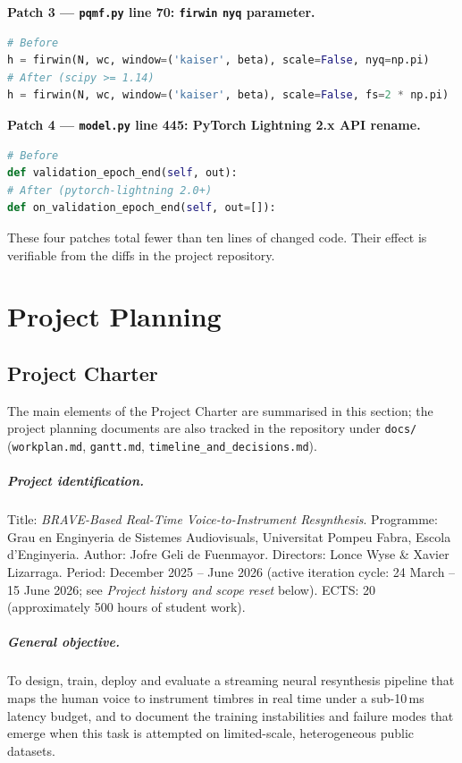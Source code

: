 \documentclass[a4paper,11pt,oneside,openany]{book}
\newcommand{\thesisAuthor}{Jofre Geli de Fuenmayor}
\newcommand{\thesisAdvisor}{Lonce Wyse \& Xavier Lizarraga}
\newcommand{\thesisInstitution}{Universitat Pompeu Fabra}
\newcommand{\thesisFaculty}{Escola d'Enginyeria}
\newcommand{\thesisDegree}{Grau en Enginyeria de Sistemes Audiovisuals}
\begin{document}
\begin{appendices}
\medskip\noindent\textbf{Patch 3 --- \texttt{pqmf.py} line 70: \texttt{firwin} \texttt{nyq} parameter.}\par\nobreak
\begin{lstlisting}[language=Python]
# Before
h = firwin(N, wc, window=('kaiser', beta), scale=False, nyq=np.pi)
# After (scipy >= 1.14)
h = firwin(N, wc, window=('kaiser', beta), scale=False, fs=2 * np.pi)
\end{lstlisting}

\medskip\noindent\textbf{Patch 4 --- \texttt{model.py} line 445: PyTorch Lightning 2.x API rename.}\par\nobreak
\begin{lstlisting}[language=Python]
# Before
def validation_epoch_end(self, out):
# After (pytorch-lightning 2.0+)
def on_validation_epoch_end(self, out=[]):
\end{lstlisting}

These four patches total fewer than ten lines of changed code. Their effect is verifiable from the diffs in the project repository.

\chapter{Project Planning}\label{app:planning}

\section{Project Charter}

The main elements of the Project Charter are summarised in this section; the project planning documents are also tracked in the repository under \texttt{docs/} (\texttt{workplan.md}, \texttt{gantt.md}, \texttt{timeline\_and\_decisions.md}).

\paragraph{Project identification.} Title: \emph{BRAVE-Based Real-Time Voice-to-Instrument Resynthesis}. Programme: \thesisDegree, \thesisInstitution, \thesisFaculty. Author: \thesisAuthor. Directors: \thesisAdvisor. Period: December 2025 -- June 2026 (active iteration cycle: 24 March -- 15 June 2026; see \emph{Project history and scope reset} below). ECTS: 20 (approximately 500 hours of student work).

\paragraph{General objective.} To design, train, deploy and evaluate a streaming neural resynthesis pipeline that maps the human voice to instrument timbres in real time under a sub-10\,ms latency budget, and to document the training instabilities and failure modes that emerge when this task is attempted on limited-scale, heterogeneous public datasets.


\end{appendices}
\end{document}
